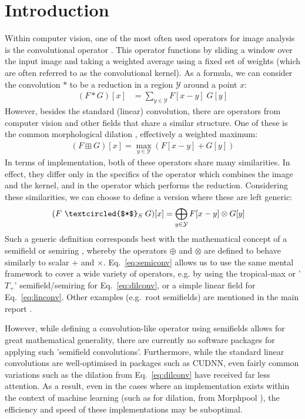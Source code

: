 \documentclass[a4paper, 12pt, openright]{report}
\begin{document}
\chapter{Introduction}
\vspace{-12pt}
Within computer vision, one of the most often used operators for image analysis is the convolutional operator \cite{gonzalez2017}. This operator functions by sliding a window over the input image and taking a weighted average using a fixed set of weights (which are often referred to as the convolutional kernel). As a formula, we can consider the convolution $*$ to be a reduction in a region $\mathcal{Y}$ around a point $x$:
\begin{align}
(F*G)[x] &= \sum_{y\in\mathcal{Y}} F[x-y]\; G[y]\label{eq:linconv}
\end{align}
However, besides the standard (linear) convolution, there are operators from computer vision and other fields that share a similar structure. One of these is the common morphological dilation \cite{heijmans1996morphological}, effectively a weighted maximum:
\begin{align}
 (F \boxplus G)[x] = \max_ {y\in\mathcal{Y}} \left(F[x-y] + G[y]\right)	\label{eq:dilconv}
\end{align}
In terms of implementation, both of these operators share many similarities. In effect, they differ only in the specifics of the operator which combines the image and the kernel, and in the operator which performs the reduction. Considering these similarities, we can choose to define a version where these are left generic:
\begin{align}
	(F ~\textcircled{$*$}_S\; G)[x] &=\bigoplus_{y\in \mathcal{Y}} F[x-y] \otimes G[y]\label{eq:semiconv}
\end{align}
Such a generic definition corresponds best with the mathematical concept of a semifield or semiring \cite{beachy2006abstract}, whereby the operators $\oplus$ and $\otimes$ are defined to behave similarly to scalar + and $\times$. Eq.\ \ref{eq:semiconv} allows us to use the same mental framework to cover a wide variety of operators, e.g. by using the tropical-max \cite{maragos} or '$T_+$' semifield/semiring for Eq.\ \ref{eq:dilconv}, or a simple linear field for Eq.\ \ref{eq:linconv}. Other examples (e.g.\ root semifields) are mentioned in the main report \cite{main_thesis}. 

However, while defining a convolution-like operator using semifields allows for great mathematical generality, there are currently no software packages for applying such 'semifield convolutions'. Furthermore, while the standard linear convolutions are well-optimised in packages such as CUDNN, even fairly common variations such as the dilation from Eq.\ \ref{eq:dilconv} have received far less attention. As a result, even in the cases where an implementation exists within the context of machine learning (such as for dilation, from Morphpool \cite{groenendijk2022morphpool}), the efficiency and speed of these implementations may be suboptimal.
\end{document}
